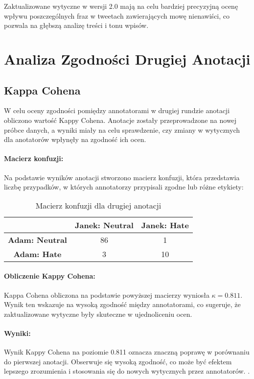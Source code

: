 \documentclass[12pt]{article}
\begin{document}
Zaktualizowane wytyczne w wersji 2.0 mają na celu bardziej precyzyjną ocenę wpływu poszczególnych fraz w tweetach zawierających mowę nienawiści, co pozwala na głębszą analizę treści i tonu wpisów.

\section{Analiza Zgodności Drugiej Anotacji}

\subsection{Kappa Cohena}

W celu oceny zgodności pomiędzy annotatorami w drugiej rundzie anotacji obliczono wartość Kappy Cohena. Anotacje zostały przeprowadzone na nowej próbce danych, a wyniki miały na celu sprawdzenie, czy zmiany w wytycznych dla anotatorów wpłynęły na zgodność ich ocen.

\paragraph{Macierz konfuzji:}
Na podstawie wyników anotacji stworzono macierz konfuzji, która przedstawia liczbę przypadków, w których annotatorzy przypisali zgodne lub różne etykiety:

\begin{table}[h!]
\centering
\begin{tabular}{|c|c|c|}
\hline
           & \textbf{Janek: Neutral} & \textbf{Janek: Hate} \\ \hline
\textbf{Adam: Neutral} & 86                      & 1                   \\ \hline
\textbf{Adam: Hate}    & 3                       & 10                  \\ \hline
\end{tabular}
\caption{Macierz konfuzji dla drugiej anotacji}
\end{table}

\paragraph{Obliczenie Kappy Cohena:}
Kappa Cohena obliczona na podstawie powyższej macierzy wyniosła \( \kappa = 0.811 \). Wynik ten wskazuje na wysoką zgodność między annotatorami, co sugeruje, że zaktualizowane wytyczne były skuteczne w ujednoliceniu ocen.

\paragraph{Wyniki:}
Wynik Kappy Cohena na poziomie 0.811 oznacza znaczną poprawę w porównaniu do pierwszej anotacji. Obserwuje się wysoką zgodność, co może być efektem lepszego zrozumienia i stosowania się do nowych wytycznych przez annotatorów. .
\end{document}
